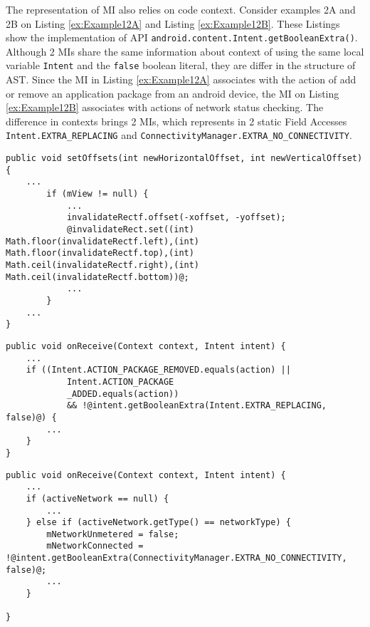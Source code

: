 The representation of MI also relies on code context. Consider examples 2A and 2B on Listing  \ref{ex:Example12A} and Listing \ref{ex:Example12B}. These Listings show the implementation of API \texttt{android.content.Intent.getBooleanExtra()}. Although 2 MIs share the same information about context of using the same local variable \texttt{Intent} and the \texttt{false} boolean literal, they are differ in the structure of AST. Since the MI in Listing \ref{ex:Example12A} associates with the action of add or remove an application package from an android device, the MI on Listing \ref{ex:Example12B} associates with actions of network status checking. The difference in contexts brings 2 MIs, which represents in 2 static Field Accesses \texttt{Intent.EXTRA\_REPLACING} and \texttt{ConnectivityManager.EXTRA\_NO\_CONNECTIVITY}. \\
\noindent
\begin{minipage}[c]{0.3\textwidth}
\begin{lstlisting}[basicstyle=\tiny,caption={Example in \cite{id:Example11Complicate}},label={Example11Complicate}]
 public void setOffsets(int newHorizontalOffset, int newVerticalOffset) {
    ...
        if (mView != null) {
            ...
            invalidateRectf.offset(-xoffset, -yoffset);
            @invalidateRect.set((int) Math.floor(invalidateRectf.left),(int) Math.floor(invalidateRectf.top),(int) Math.ceil(invalidateRectf.right),(int) Math.ceil(invalidateRectf.bottom))@;
            ...
        }
    ...
}
\end{lstlisting}
\end{minipage}\hfill
\begin{minipage}[c]{0.3\textwidth}
\begin{lstlisting}[basicstyle=\tiny,caption={Example 2A in \cite{id:Example12A}},label={ex:Example12A},]
 public void onReceive(Context context, Intent intent) {
    ...
    if ((Intent.ACTION_PACKAGE_REMOVED.equals(action) ||
            Intent.ACTION_PACKAGE
            _ADDED.equals(action))
            && !@intent.getBooleanExtra(Intent.EXTRA_REPLACING, false)@) {
        ...
    }
}
\end{lstlisting}

\end{minipage}\hfill
\begin{minipage}[c]{.3\textwidth}
\begin{lstlisting}[basicstyle=\tiny,caption={Example 2B in \cite{id:Example12B}},label={ex:Example12B}]
public void onReceive(Context context, Intent intent) {
    ...
    if (activeNetwork == null) {
        ...
    } else if (activeNetwork.getType() == networkType) {
        mNetworkUnmetered = false;
        mNetworkConnected = !@intent.getBooleanExtra(ConnectivityManager.EXTRA_NO_CONNECTIVITY, false)@;
        ...
    }
    
}
\end{lstlisting}
\end{minipage}\hfill

